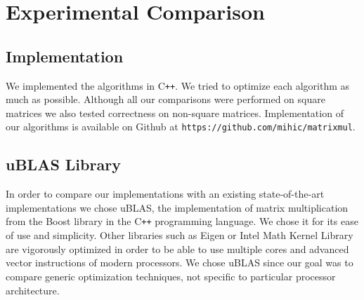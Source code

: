 \documentclass[a4paper,11pt]{article}
\newcommand{\cpp}{C\texttt{++} }
\begin{document}

\section{Experimental Comparison}
\label{section:experim}

\subsection{Implementation}
We implemented the algorithms in C\texttt{++}. We tried to optimize each algorithm as much as possible. Although all our comparisons were performed on square matrices we also tested correctness on non-square matrices. Implementation of our algorithms is available on Github at \texttt{https://github.com/mihic/matrixmul}.

\subsection{uBLAS Library}
In order to compare our implementations with an existing state-of-the-art implementations we chose uBLAS, the implementation of matrix multiplication from the Boost library in the \cpp programming language. We chose it for its ease of use and simplicity. Other libraries such as Eigen \cite{eigen} or Intel Math Kernel Library \cite{mkl} are vigorously optimized in order to be able to use multiple cores and advanced vector instructions of modern processors. We chose uBLAS since our goal was to compare generic optimization techniques, not specific to particular processor architecture.
\end{document}

